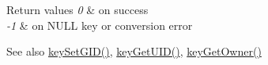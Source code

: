 \begin{DoxyRetVals}{Return values}
{\em 0} & on success \\
\hline
{\em -\/1} & on N\+U\+LL key or conversion error \\
\hline
\end{DoxyRetVals}
\begin{DoxySeeAlso}{See also}
\hyperlink{group__meta_ga9e3d0fb3f7ba906e067727b9155d22e3}{key\+Set\+G\+I\+D()}, \hyperlink{group__meta_gacaa5060e67b03f50ae49a3620c54bc46}{key\+Get\+U\+I\+D()}, \hyperlink{owner_8c_a35922a017bee8b4bcb493bbdfad9d6f5}{key\+Get\+Owner()} 
\end{DoxySeeAlso}
